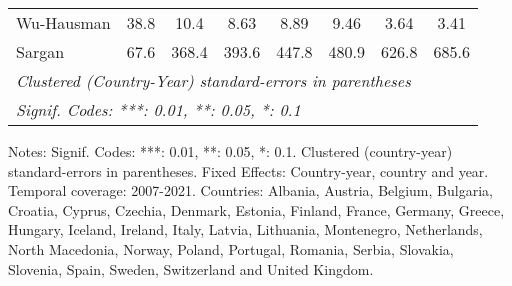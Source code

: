 \begin{table}[htbp]
\begin{tabular}{lccccccc}
      Wu-Hausman                            & 38.8          & 10.4          & 8.63          & 8.89          & 9.46          & 3.64          & 3.41\\  
      Sargan                                & 67.6          & 368.4         & 393.6         & 447.8         & 480.9         & 626.8         & 685.6\\  
      \midrule \midrule
      \multicolumn{8}{l}{\emph{Clustered (Country-Year) standard-errors in parentheses}}\\
      \multicolumn{8}{l}{\emph{Signif. Codes: ***: 0.01, **: 0.05, *: 0.1}}\\
   \end{tabular}
   
   \par \raggedright 
   Notes: Signif. Codes: ***: 0.01, **: 0.05, *: 0.1. Clustered (country-year) standard-errors in parentheses. Fixed Effects: Country-year, country and year. Temporal coverage: 2007-2021. Countries: Albania, Austria, Belgium, Bulgaria, Croatia, Cyprus, Czechia, Denmark, Estonia, Finland, France, Germany, Greece, Hungary, Iceland, Ireland, Italy, Latvia, Lithuania, Montenegro, Netherlands, North Macedonia, Norway, Poland, Portugal, Romania, Serbia, Slovakia, Slovenia, Spain, Sweden, Switzerland and United Kingdom.
\end{table}


